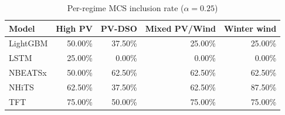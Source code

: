 \begin{table}
\caption{Per-regime MCS inclusion rate ($\alpha=0.25$)}
\begin{tabular}{lrrrr}
\toprule
Model & High PV & PV-DSO & Mixed PV/Wind & Winter wind \\
\midrule
LightGBM & 50.00\% & 37.50\% & 25.00\% & 25.00\% \\
LSTM & 25.00\% & 0.00\% & 0.00\% & 0.00\% \\
NBEATSx & 50.00\% & 62.50\% & 62.50\% & 62.50\% \\
NHiTS & 62.50\% & 37.50\% & 62.50\% & 87.50\% \\
TFT & 75.00\% & 50.00\% & 75.00\% & 75.00\% \\
\bottomrule
\end{tabular}
\end{table}
